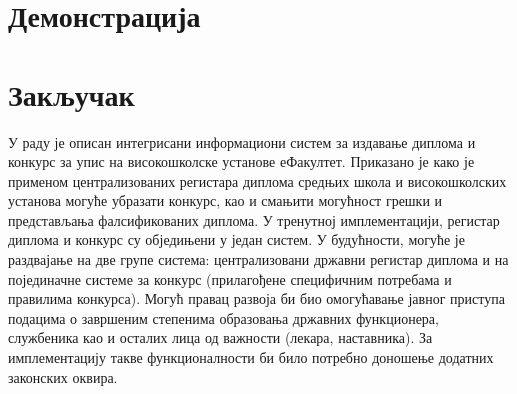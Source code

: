 \documentclass[a4paper]{article}
\begin{document}
\section*{Демонстрација}

\section*{Закључак}

У раду је описан интегрисани информациони систем за издавање диплома и конкурс за упис на високошколске установе еФакултет.
Приказано је како је применом централизованих регистара диплома средњих школа и високошколских установа могуће убразати
конкурс, као и смањити могућност грешки и представљања фалсификованих диплома. У тренутној имплементацији, регистар диплома
и конкурс су обједињени у један систем. У будућности, могуће је раздвајање на две групе система:
централизовани државни регистар диплома и на појединачне системе за конкурс (прилагођене специфичним потребама и
правилима конкурса). Могућ правац развоја би био омогућавање јавног приступа подацима о завршеним степенима образовања
државних функционера, службеника као и осталих лица од важности (лекара, наставника). За имплементацију такве функционалности
би било потребно доношење додатних законских оквира.



\end{document}
